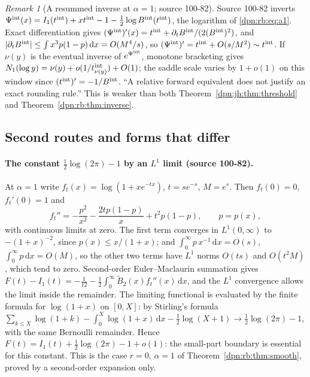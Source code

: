\documentclass[11pt]{article}
\numberwithin{equation}{section}
\theoremstyle{definition}\newtheorem{definition}[theorem]{Definition}
\theoremstyle{remark}\newtheorem{remark}[theorem]{Remark}
\newcommand{\dd}{\,\mathrm d}\newcommand{\ii}{\mathrm i}
\newcommand{\src}[1]{\textup{(source #1)}}
\begin{document}
\begin{remark}[A resummed inverse at $\alpha=1$; source 100-82]\label{dpn:rb:rem:resummed}
Source 100-82 inverts $\Psi^{\rm int}(x)=I_1(t^{\rm int})+xt^{\rm int}-1
-\frac12\log B^{\rm int}(t^{\rm int})$, the logarithm of \eqref{dpn:rb:eq:a1}.
Exact differentiation gives $(\Psi^{\rm int})'(x)=t^{\rm int}
+\partial_tB^{\rm int}/(2(B^{\rm int})^2)$, and $|\partial_tB^{\rm int}|\le\int
x^3p(1-p)\dd x=O(M^4/s)$, so $(\Psi^{\rm int})'=t^{\rm int}+O(s/M^2)\sim
t^{\rm int}$.  If $\nu(y)$ is the eventual inverse of $e^{\Psi^{\rm int}}$,
monotone bracketing gives $N_1(\log y)=\nu(y)+o(1/t^{\rm int}_{\nu(y)})+O(1)$;
the saddle scale varies by $1+o(1)$ on this window since
$(t^{\rm int})'=-1/B^{\rm int}$.  ``A relative forward equivalent does not
justify an exact rounding rule.''  This is weaker than both
Theorem~\ref{dpn:jh:thm:threshold} and Theorem~\ref{dpn:rb:thm:inverse}.
\end{remark}

\subsection{Second routes and forms that differ}\label{dpn:rb:sec:routes}
\paragraph{The constant $\frac12\log(2\pi)-1$ by an $L^1$ limit \src{100-82}.}
At $\alpha=1$ write $f_t(x)=\log(1+xe^{-tx})$, $t=se^{-s}$, $M=e^s$.  Then
$f_t(0)=0$, $f_t'(0)=1$ and
\begin{equation}\label{dpn:rb:eq:fsecond}
 f_t''=-\frac{p^2}{x^2}-\frac{2tp(1-p)}x+t^2p(1-p),\qquad p=p(x),
\end{equation}
with continuous limits at zero.  The first term converges in $L^1(0,\infty)$
to $-(1+x)^{-2}$, since $p(x)\le x/(1+x)$; and
$\int_0^\infty p\,x^{-1}\dd x=O(s)$, $\int_0^\infty p\dd x=O(M)$, so the other two
terms have $L^1$ norms $O(ts)$ and $O(t^2M)$, which tend to zero.
Second-order Euler--Maclaurin summation gives
$F(t)-I_1(t)=-\frac1{12}-\frac12\int_0^\infty\widetilde B_2(x)f_t''(x)\dd x$,
and the $L^1$ convergence allows the limit inside the remainder.  The
limiting functional is evaluated by the finite formula for $\log(1+x)$ on
$[0,X]$: by Stirling's formula
$\sum_{k\le X}\log(1+k)-\int_0^X\log(1+x)\dd x-\frac12\log(X+1)\to
\frac12\log(2\pi)-1$, with the same Bernoulli remainder.  Hence
$F(t)=I_1(t)+\frac12\log(2\pi)-1+o(1)$: the small-part boundary is essential
for this constant.  This is the case $r=0$, $\alpha=1$ of
Theorem~\ref{dpn:rb:thm:smooth}, proved by a second-order expansion only.
\end{document}
